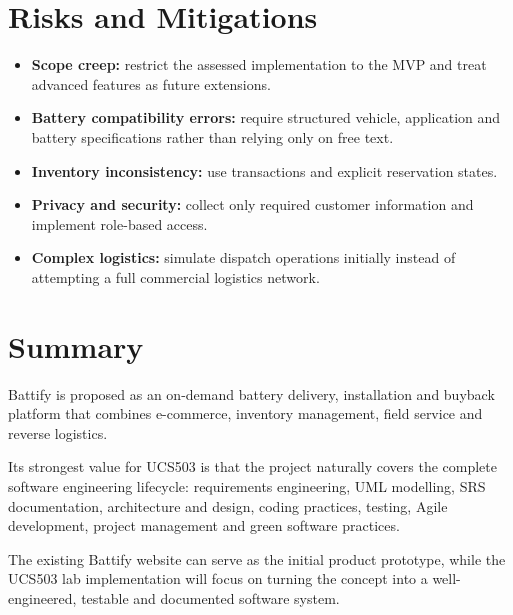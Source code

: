 \documentclass[11pt,a4paper]{article}
\begin{document}
\section{Risks and Mitigations}

\begin{itemize}[leftmargin=0.7cm]
    \item \textbf{Scope creep:} restrict the assessed implementation to the
    MVP and treat advanced features as future extensions.
    \item \textbf{Battery compatibility errors:} require structured vehicle,
    application and battery specifications rather than relying only on free
    text.
    \item \textbf{Inventory inconsistency:} use transactions and explicit
    reservation states.
    \item \textbf{Privacy and security:} collect only required customer
    information and implement role-based access.
    \item \textbf{Complex logistics:} simulate dispatch operations initially
    instead of attempting a full commercial logistics network.
\end{itemize}

\section{Summary}

Battify is proposed as an on-demand battery delivery, installation and
buyback platform that combines e-commerce, inventory management, field
service and reverse logistics.

Its strongest value for UCS503 is that the project naturally covers the
complete software engineering lifecycle: requirements engineering, UML
modelling, SRS documentation, architecture and design, coding practices,
testing, Agile development, project management and green software practices.

The existing Battify website can serve as the initial product prototype,
while the UCS503 lab implementation will focus on turning the concept into a
well-engineered, testable and documented software system.
\end{document}
